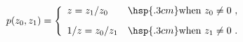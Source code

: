 \begin{equation}
p(z_0,z_1)= \left\{ \begin{array}{ll}
                     z=z_1/z_0 & \hsp{.3cm} \mbox{when $z_0\neq 0$} \ ,\\ [.3cm]
                     1/z=z_0/z_1 & \hsp{.3cm} \mbox{when $z_1\neq 0$}\ .
                    \end{array}
            \right.
\end{equation} 
